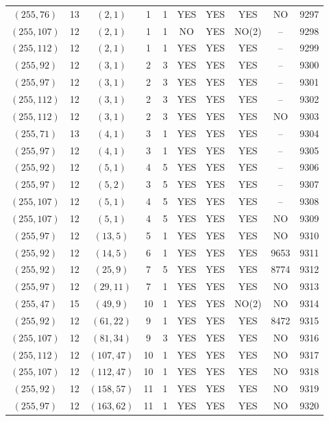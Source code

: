\begin{longtable}{|c|c|c|c|c|c|c|c|c|c|}
$(255, 76)$ & 13 & $(2, 1)$ & 1 & 1 & YES & YES & YES & NO & 9297\\
$(255, 107)$ & 12 & $(2, 1)$ & 1 & 1 & NO & YES & NO(2) & -- & 9298\\
$(255, 112)$ & 12 & $(2, 1)$ & 1 & 1 & YES & YES & YES & -- & 9299\\
$(255, 92)$ & 12 & $(3, 1)$ & 2 & 3 & YES & YES & YES & -- & 9300\\
$(255, 97)$ & 12 & $(3, 1)$ & 2 & 3 & YES & YES & YES & -- & 9301\\
$(255, 112)$ & 12 & $(3, 1)$ & 2 & 3 & YES & YES & YES & -- & 9302\\
$(255, 112)$ & 12 & $(3, 1)$ & 2 & 3 & YES & YES & YES & NO & 9303\\
$(255, 71)$ & 13 & $(4, 1)$ & 3 & 1 & YES & YES & YES & -- & 9304\\
$(255, 97)$ & 12 & $(4, 1)$ & 3 & 1 & YES & YES & YES & -- & 9305\\
$(255, 92)$ & 12 & $(5, 1)$ & 4 & 5 & YES & YES & YES & -- & 9306\\
$(255, 97)$ & 12 & $(5, 2)$ & 3 & 5 & YES & YES & YES & -- & 9307\\
$(255, 107)$ & 12 & $(5, 1)$ & 4 & 5 & YES & YES & YES & -- & 9308\\
$(255, 107)$ & 12 & $(5, 1)$ & 4 & 5 & YES & YES & YES & NO & 9309\\
$(255, 97)$ & 12 & $(13, 5)$ & 5 & 1 & YES & YES & YES & NO & 9310\\
$(255, 92)$ & 12 & $(14, 5)$ & 6 & 1 & YES & YES & YES & 9653 & 9311\\
$(255, 92)$ & 12 & $(25, 9)$ & 7 & 5 & YES & YES & YES & 8774 & 9312\\
$(255, 97)$ & 12 & $(29, 11)$ & 7 & 1 & YES & YES & YES & NO & 9313\\
$(255, 47)$ & 15 & $(49, 9)$ & 10 & 1 & YES & YES & NO(2) & NO & 9314\\
$(255, 92)$ & 12 & $(61, 22)$ & 9 & 1 & YES & YES & YES & 8472 & 9315\\
$(255, 107)$ & 12 & $(81, 34)$ & 9 & 3 & YES & YES & YES & NO & 9316\\
$(255, 112)$ & 12 & $(107, 47)$ & 10 & 1 & YES & YES & YES & NO & 9317\\
$(255, 107)$ & 12 & $(112, 47)$ & 10 & 1 & YES & YES & YES & NO & 9318\\
$(255, 92)$ & 12 & $(158, 57)$ & 11 & 1 & YES & YES & YES & NO & 9319\\
$(255, 97)$ & 12 & $(163, 62)$ & 11 & 1 & YES & YES & YES & NO & 9320\\

\end{longtable}
